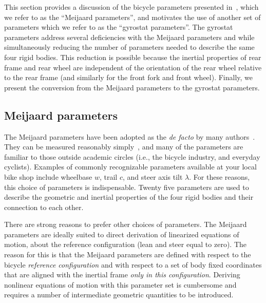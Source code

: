 This section provides a discussion of the bicycle parameters presented
in~\cite{Meijaard2007}, which we refer to as the ``Meijaard parameters'', and
motivates the use of another set of parameters which we refer to as the
``gyrostat parameters''. The gyrostat parameters address several deficiencies
with the Meijaard parameters and while simultaneously reducing the number of
parameters needed to describe the same four rigid bodies. This reduction is
possible because the inertial properties of rear frame and rear wheel are
independent of the orientation of the rear wheel relative to the rear frame
(and similarly for the front fork and front wheel). Finally, we present the
conversion from the Meijaard parameters to the gyrostat parameters.

\subsection{Meijaard parameters} \label{model:meijaard_parameters}
The Meijaard parameters have been adopted as the \textit{de facto} by many
authors~\cite{Sharp2008}. They can be measured reasonably
simply~\cite{Moore2010b}, and many of the parameters are familiar to those
outside academic circles (i.e., the bicycle industry, and everyday cyclists).
Examples of commonly recognizable parameters available at your local bike shop
include wheelbase $w$, trail $c$, and steer axis tilt $\lambda$. For these
reasons, this choice of parameters is indispensable.  Twenty five parameters
are used to describe the geometric and inertial properties of the four rigid
bodies and their connection to each other.

There are strong reasons to prefer other choices of parameters. The Meijaard
parameters are ideally suited to direct derivation of linearized equations of
motion, about the reference configuration (lean and steer equal to zero). The
reason for this is that the Meijaard parameters are defined with respect to the
bicycle \textit{reference configuration} and with respect to a set of body
fixed coordinates that are aligned with the inertial frame \textit{only in this
configuration}. Deriving nonlinear equations of motion with this parameter set
is cumbersome and requires a number of intermediate geometric quantities to be
introduced.


